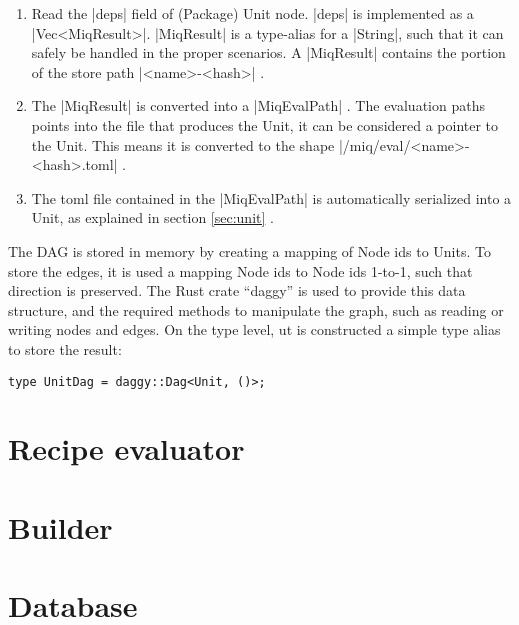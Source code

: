 \begin{enumerate}
    \item Read the |deps| field of (Package) Unit node.
    |deps| is implemented as a |Vec<MiqResult>|. |MiqResult|
    is a type-alias for a |String|, such that it can safely
    be handled in the proper scenarios. A |MiqResult|
    contains the portion of the store path |<name>-<hash>| .

    \item The |MiqResult| is converted into a |MiqEvalPath|
    . The evaluation paths points into the file that
    produces the Unit, it can be considered a pointer to the
    Unit. This means it is converted to the shape
    |/miq/eval/<name>-<hash>.toml| .

    \item The toml file contained in the |MiqEvalPath| is
    automatically serialized into a Unit, as explained in
    section \ref{sec:unit} .
\end{enumerate}

The \ac{DAG} is stored in memory by creating a mapping of
Node ids to Units. To store the edges, it is used a mapping Node ids to
Node ids 1-to-1, such that direction is preserved. The Rust
crate ``daggy'' \cite{DaggyRust} is used to provide this
data structure, and the required methods to manipulate the
graph, such as reading or writing nodes and edges. On the
type level, ut is
constructed a simple type alias to store the result:

\begin{verbatim}
type UnitDag = daggy::Dag<Unit, ()>;
\end{verbatim}

\section{Recipe evaluator}
\label{sec:lua}

\section{Builder}
\label{sec:builder}

\section{Database}
